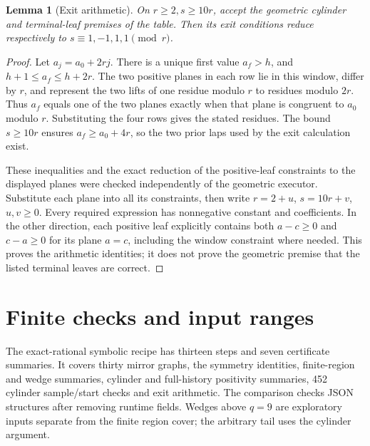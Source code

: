 \documentclass[11pt]{amsart}
\newcommand{\claimid}[1]{}
\newtheorem{lemma}[theorem]{Lemma}
\theoremstyle{definition}\newtheorem{definition}[theorem]{Definition}
\begin{document}
\begin{lemma}[Exit arithmetic]\label{lem:exit-congruence}
On $r\ge2,s\ge10r$, accept the geometric cylinder and terminal-leaf
premises of the table. Then its exit conditions reduce respectively
to $s\equiv1,-1,1,1\pmod r$.
\end{lemma}
\claimid{lem:exit-congruence}
\begin{proof}
Let $a_j=a_0+2rj$. There is a unique first value $a_f>h$, and
$h+1\le a_f\le h+2r$. The two positive planes in each row lie in this
window, differ by $r$, and represent the two lifts of one residue
modulo $r$ to residues modulo $2r$. Thus $a_f$ equals one of the two
planes exactly when that plane is congruent to $a_0$ modulo $r$.
Substituting the four rows gives the stated residues. The bound
$s\ge10r$ ensures $a_f\ge a_0+4r$, so the two prior laps used by the
exit calculation exist.

These inequalities and the exact reduction of the positive-leaf
constraints to the displayed planes were checked independently of
the geometric executor. Substitute each plane into all its constraints,
then write $r=2+u$, $s=10r+v$, $u,v\ge0$. Every required expression has
nonnegative constant and coefficients. In the other direction, each
positive leaf explicitly contains both $a-c\ge0$ and $c-a\ge0$ for
its plane $a=c$, including the window constraint where needed.
This proves the arithmetic identities; it does not prove the
geometric premise that the listed terminal leaves are correct.
\end{proof}

\section{Finite checks and input ranges}
The exact-rational symbolic recipe has thirteen steps and seven
certificate summaries. It covers thirty mirror graphs, the symmetry
identities, finite-region and wedge summaries, cylinder and full-history
positivity summaries, 452 cylinder sample/start checks and exit
arithmetic. The comparison checks JSON structures after removing runtime
fields. Wedges above $q=9$ are exploratory inputs separate from the
finite region cover; the arbitrary tail uses the cylinder argument.
\end{document}
